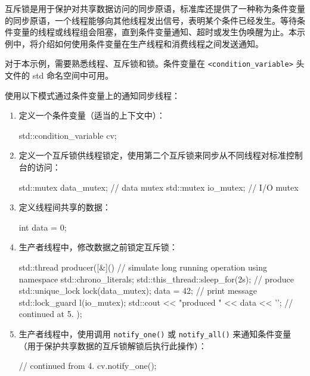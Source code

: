 
互斥锁是用于保护对共享数据访问的同步原语，标准库还提供了一种称为条件变量的同步原语，一个线程能够向其他线程发出信号，表明某个条件已经发生。等待条件变量的线程或线程组会阻塞，直到条件变量通知、超时或发生伪唤醒为止。本示例中，将介绍如何使用条件变量在生产线程和消费线程之间发送通知。


对于本示例，需要熟悉线程、互斥锁和锁。条件变量在 \verb|<condition_variable>| 头文件的 std 命名空间中可用。


使用以下模式通过条件变量上的通知同步线程：

\begin{enumerate}
\item
定义一个条件变量（适当的上下文中）：

\begin{cpp}
std::condition_variable cv;
\end{cpp}

\item
定义一个互斥锁供线程锁定，使用第二个互斥锁来同步从不同线程对标准控制台的访问：

\begin{cpp}
std::mutex data_mutex; // data mutex
std::mutex io_mutex;   // I/O mutex
\end{cpp}

\item
定义线程间共享的数据：

\begin{cpp}
int data = 0;
\end{cpp}

\item
生产者线程中，修改数据之前锁定互斥锁：

\begin{cpp}
std::thread producer([&](){
    // simulate long running operation
    {
        using namespace std::chrono_literals;
        std::this_thread::sleep_for(2s);
    }
    // produce
    {
        std::unique_lock lock(data_mutex);
        data = 42;
    }
    // print message
    {
        std::lock_guard l(io_mutex);
        std::cout << "produced " << data << '\n';
    }
    // continued at 5.
});
\end{cpp}

\item
生产者线程中，使用调用 \verb|notify_one()| 或 \verb|notify_all()| 来通知条件变量（用于保护共享数据的互斥锁解锁后执行此操作）：

\begin{cpp}
// continued from 4.
cv.notify_one();
\end{cpp}


\end{enumerate}

